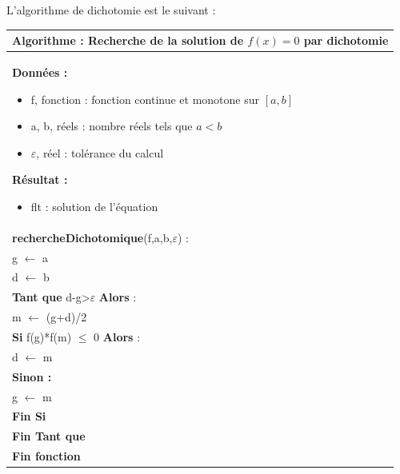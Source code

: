 \documentclass[10pt]{article}
\begin{document}
L'algorithme de dichotomie est le suivant :

\begin{pseudo}
\begin{center}
\begin{tabular}{p{}}
\hline
\textbf{Algorithme :} Recherche de la solution de $f(x)=0$ par dichotomie \\
\hline
\textbf{Données :}
\begin{itemize}
\item \textsf{f}, fonction : fonction continue et monotone sur $[a,b]$
\item \textsf{a, b}, réels : nombre réels tels que $a<b$
\item \textsf{$\varepsilon$}, réel : tolérance du calcul
\end{itemize}
\textbf{Résultat :} 
\begin{itemize}
\item flt : solution de l'équation
\end{itemize}
\\
\textbf{rechercheDichotomique}(\textsf{f,a,b,$\varepsilon$}) :\\
\hspace{.4cm}\textsf{g} $\leftarrow$ \textsf{a} \\
\hspace{.4cm}\textsf{d} $\leftarrow$ \textsf{b} \\
\hspace{.4cm}\textbf{Tant que} \textsf{d-g>$\varepsilon$} \textbf{Alors} : \\
\hspace{.8cm}\textsf{m} $\leftarrow$ \textsf{(g+d)/2} \\
\hspace{.8cm}\textbf{Si} \textsf{f(g)*f(m) $\leq$ 0} \textbf{Alors} : \\
\hspace{1.2cm}\textsf{d $\leftarrow$  m} \\
\hspace{.8cm} \textbf{Sinon :} \\
\hspace{1.2cm}\textsf{g $\leftarrow$  m} \\
\hspace{.8cm} \textbf{Fin Si}\\
\hspace{.4cm} \textbf{Fin Tant que}\\
\textbf{Fin fonction} \\
\hline
\end{tabular}
\end{center}
\end{pseudo}
\end{document}

